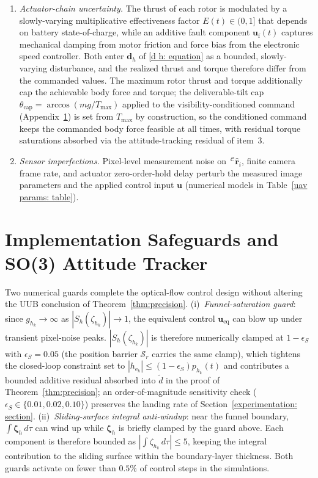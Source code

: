 \documentclass{IEEEtaes}
\theoremstyle{definition}
\theoremstyle{remark}
\begin{document}
\begin{enumerate}
    \item \emph{Actuator-chain uncertainty.} The thrust of each rotor is modulated by a slowly-varying multiplicative effectiveness factor $E(t)\in(0,1]$ that depends on battery state-of-charge, while an additive fault component $\boldsymbol{u}_\text{f}(t)$ captures mechanical damping from motor friction and force bias from the electronic speed controller. Both enter $\boldsymbol{d}_h$ of \eqref{d h: equation} as a bounded, slowly-varying disturbance, and the realized thrust and torque therefore differ from the commanded values. The maximum rotor thrust and torque additionally cap the achievable body force and torque; the deliverable-tilt cap $\theta_\text{cap}=\arccos(mg/T_\text{max})$ applied to the visibility-conditioned command (Appendix~\ref{implementation appendix: section}) is set from $T_\text{max}$ by construction, so the conditioned command keeps the commanded body force feasible at all times, with residual torque saturations absorbed via the attitude-tracking residual of item~3.
    \item \emph{Sensor imperfections.} Pixel-level measurement noise on $\,^\mathcal{C}\hat{\boldsymbol{r}}_i$, finite camera frame rate, and actuator zero-order-hold delay perturb the measured image parameters and the applied control input $\boldsymbol{u}$ (numerical models in Table~\ref{uav params: table}).
\end{enumerate}

\section{Implementation Safeguards and SO(3) Attitude Tracker} \label{implementation appendix: section}
Two numerical guards complete the optical-flow control design without altering the UUB conclusion of Theorem~\ref{thm:precision}. (i)~\emph{Funnel-saturation guard}: since $g_{h_k}\to\infty$ as $|S_h(\zeta_{h_k})|\to 1$, the equivalent control $\boldsymbol{u}_\text{eq}$ can blow up under transient pixel-noise peaks. $|S_h(\zeta_{h_k})|$ is therefore numerically clamped at $1-\epsilon_S$ with $\epsilon_S=0.05$ (the position barrier $\mathcal{S}_r$ carries the same clamp), which tightens the closed-loop constraint set to $|h_{\text{e}_k}|\le(1-\epsilon_S)p_{h_k}(t)$ and contributes a bounded additive residual absorbed into $\tilde{d}$ in the proof of Theorem~\ref{thm:precision}; an order-of-magnitude sensitivity check ($\epsilon_S\in\{0.01,0.02,0.10\}$) preserves the landing rate of Section~\ref{experimentation: section}. (ii)~\emph{Sliding-surface integral anti-windup}: near the funnel boundary, $\int\boldsymbol{\zeta}_h\,d\tau$ can wind up while $\boldsymbol{\zeta}_h$ is briefly clamped by the guard above. Each component is therefore bounded as $|\!\int\!\zeta_{h_k}\,d\tau|\le 5$, keeping the integral contribution to the sliding surface within the boundary-layer thickness. Both guards activate on fewer than $0.5\%$ of control steps in the simulations.
\end{document}
